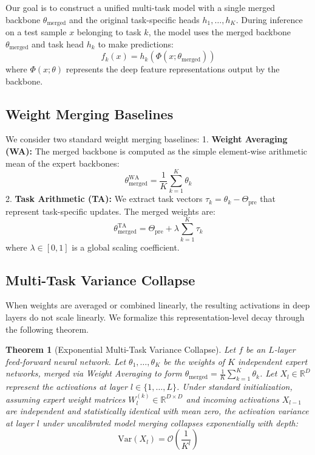 \documentclass{article}
\theoremstyle{plain}
\newtheorem{theorem}{Theorem}[section]
\theoremstyle{definition}
\theoremstyle{remark}
\begin{document}
Our goal is to construct a unified multi-task model with a single merged backbone $\theta_{\text{merged}}$ and the original task-specific heads $h_1, \dots, h_K$. During inference on a test sample $x$ belonging to task $k$, the model uses the merged backbone $\theta_{\text{merged}}$ and task head $h_k$ to make predictions:
\begin{equation}
f_k(x) = h_k(\Phi(x; \theta_{\text{merged}}))
\end{equation}
where $\Phi(x; \theta)$ represents the deep feature representations output by the backbone.

\subsection{Weight Merging Baselines}
We consider two standard weight merging baselines:
1. \textbf{Weight Averaging (WA):} The merged backbone is computed as the simple element-wise arithmetic mean of the expert backbones:
\begin{equation}
\theta_{\text{merged}}^{\text{WA}} = \frac{1}{K} \sum_{k=1}^K \theta_k
\end{equation}
2. \textbf{Task Arithmetic (TA):} We extract task vectors $\tau_k = \theta_k - \Theta_{\text{pre}}$ that represent task-specific updates. The merged weights are:
\begin{equation}
\theta_{\text{merged}}^{\text{TA}} = \Theta_{\text{pre}} + \lambda \sum_{k=1}^K \tau_k
\end{equation}
where $\lambda \in [0, 1]$ is a global scaling coefficient.

\subsection{Multi-Task Variance Collapse}
When weights are averaged or combined linearly, the resulting activations in deep layers do not scale linearly. We formalize this representation-level decay through the following theorem.

\begin{theorem}[Exponential Multi-Task Variance Collapse]
Let $f$ be an $L$-layer feed-forward neural network. Let $\theta_1, \dots, \theta_K$ be the weights of $K$ independent expert networks, merged via Weight Averaging to form $\theta_{\text{merged}} = \frac{1}{K} \sum_{k=1}^K \theta_k$. Let $X_l \in \mathbb{R}^D$ represent the activations at layer $l \in \{1, \dots, L\}$. Under standard initialization, assuming expert weight matrices $W_l^{(k)} \in \mathbb{R}^{D \times D}$ and incoming activations $X_{l-1}$ are independent and statistically identical with mean zero, the activation variance at layer $l$ under uncalibrated model merging collapses exponentially with depth:
\begin{equation}
\text{Var}(X_l) = \mathcal{O}\left(\frac{1}{K^l}\right)
\end{equation}
\end{theorem}
\end{document}
